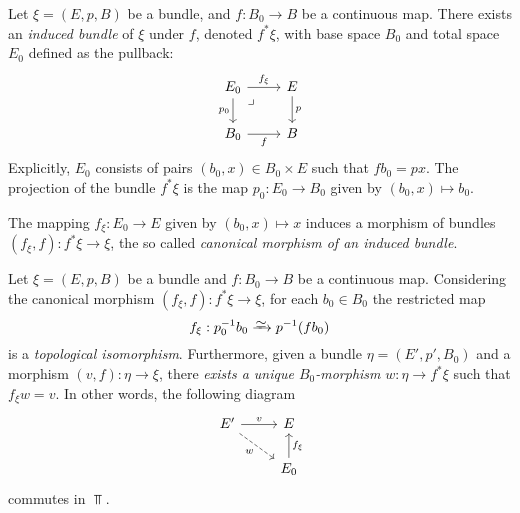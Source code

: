 \documentclass[../../../deep-dive]{subfile}
\begin{document}
\begin{definition}
    \label{def:induced-bundle}
    Let \(\xi = (E, p, B)\) be a bundle, and \(f: B_0 \to B\) be a continuous
    map. There exists an \emph{induced bundle} of \(\xi\) under \(f\), denoted
    \(f^{*} \xi\), with base space \(B_0\) and total space \(E_0\) defined as the
    pullback:
    \[
        \begin{tikzcd}
            E_0
            \ar[rd, phantom, very near start, "\lrcorner"]
            \ar[r, "f_{\xi}"]
            \ar[d, "p_0"']
            &E
            \ar[d, "p"]
            \\
            B_0 \ar[r, "f"']
            &B
        \end{tikzcd}
    \]
    Explicitly, \(E_0\) consists of pairs \((b_0, x) \in B_0 \times E\) such that
    \(f b_0 = p x\). The projection of the bundle \(f^{*} \xi\) is the map
    \(p_0: E_0 \to B_0\) given by \((b_0, x) \mapsto b_0\).

    The mapping \(f_{\xi}: E_0 \to E\) given by \((b_0, x) \mapsto x\) induces a
    morphism of bundles \((f_{\xi}, f): f^{*} \xi \to \xi\), the so called
    \emph{canonical morphism of an induced bundle}.
\end{definition}

\begin{proposition}
    \label{prop:induced-bundle-associated-isomorphisms}
    Let \(\xi = (E, p, B)\) be a bundle and \(f: B_0 \to B\) be a continuous
    map. Considering the canonical morphism \((f_{\xi}, f): f^{*} \xi \to \xi\),
    for each \(b_0 \in B_0\) the restricted map
    \[
        f_{\xi}: p_0^{-1} b_0 \isoto p^{-1}(f b_0)
    \]
    is a \emph{topological isomorphism}. Furthermore, given a bundle
    \(\eta = (E', p', B_0)\) and a morphism \((v, f): \eta \to \xi\), there
    \emph{exists a unique \(B_0\)-morphism} \(w: \eta \to f^{*} \xi\) such that
    \(f_{\xi} w = v\). In other words, the following diagram
    \[
        \begin{tikzcd}
            E' \ar[r, "v"] \ar[rd, dashed, "w"'] &E \\
            &E_0 \ar[u, "f_{\xi}"']
        \end{tikzcd}
    \]
    commutes in \(\Top\).
\end{proposition}
\end{document}
